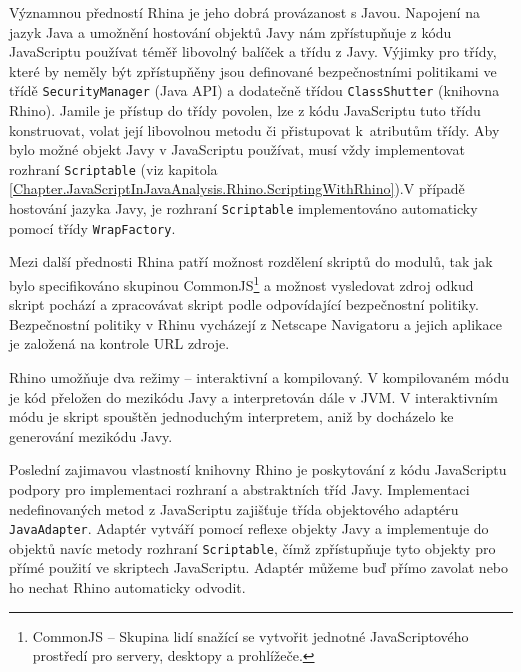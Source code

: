Významnou předností Rhina je jeho dobrá provázanost s Javou. Napojení na jazyk Java a umožnění hostování objektů Javy nám zpřístupňuje z kódu JavaScriptu používat téměř libovolný balíček a třídu z Javy. Výjimky pro třídy, které by neměly být zpřístupňěny jsou definované bezpečnostními politikami ve třídě \texttt{SecurityManager} (Java API) a dodatečně třídou \texttt{ClassShutter} (knihovna Rhino). Jamile je přístup do třídy povolen, lze z kódu JavaScriptu tuto třídu konstruovat, volat její libovolnou metodu či přistupovat k~atributům třídy. Aby bylo možné objekt Javy v JavaScriptu používat, musí vždy implementovat rozhraní \texttt{Scriptable} (viz kapitola \ref{Chapter.JavaScriptInJavaAnalysis.Rhino.ScriptingWithRhino}).V případě hostování jazyka Javy, je rozhraní \texttt{Scriptable} implementováno automaticky pomocí třídy \texttt{WrapFactory}. 

Mezi další přednosti Rhina patří možnost rozdělení skriptů do modulů, tak jak bylo specifikováno skupinou CommonJS\footnote{CommonJS -- Skupina lidí snažící se vytvořit jednotné JavaScriptového prostředí pro servery, desktopy a prohlížeče.} a možnost vysledovat zdroj odkud skript pochází a zpracovávat skript podle odpovídající bezpečnostní politiky. Bezpečnostní politiky v Rhinu vycházejí z Netscape Navigatoru a jejich aplikace je založená na kontrole URL zdroje. \cite{Bibliography.Rhino.Overview}

Rhino umožňuje dva režimy -- interaktivní a kompilovaný. V kompilovaném módu je kód přeložen do mezikódu Javy a interpretován dále v JVM. V interaktivním módu je skript spouštěn jednoduchým interpretem, aniž by docházelo ke generování mezikódu Javy.

Poslední zajimavou vlastností knihovny Rhino je poskytování z kódu JavaScriptu podpory pro implementaci rozhraní a abstraktních tříd Javy. Implementaci nedefinovaných metod z JavaScriptu zajišťuje třída objektového adaptéru \texttt{JavaAdapter}. Adaptér vytváří pomocí reflexe objekty Javy a implementuje do objektů navíc metody rozhraní \texttt{Scriptable}, čímž zpřístupňuje tyto objekty pro přímé použití ve skriptech JavaScriptu. Adaptér můžeme buď přímo zavolat nebo ho nechat Rhino automaticky odvodit. 


